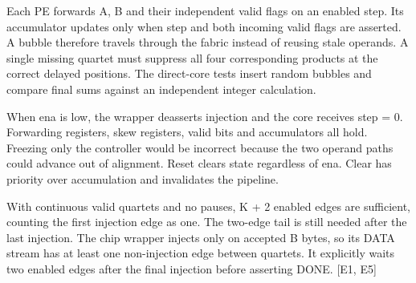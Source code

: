 \documentclass[10pt,letterpaper]{article}
\begin{document}
Each PE forwards A, B and their independent valid flags on an enabled step. Its accumulator updates only when step and both incoming valid flags are asserted. A bubble therefore travels through the fabric instead of reusing stale operands. A single missing quartet must suppress all four corresponding products at the correct delayed positions. The direct-core tests insert random bubbles and compare final sums against an independent integer calculation.

When ena is low, the wrapper deasserts injection and the core receives step = 0. Forwarding registers, skew registers, valid bits and accumulators all hold. Freezing only the controller would be incorrect because the two operand paths could advance out of alignment. Reset clears state regardless of ena. Clear has priority over accumulation and invalidates the pipeline.

With continuous valid quartets and no pauses, K + 2 enabled edges are sufficient, counting the first injection edge as one. The two-edge tail is still needed after the last injection. The chip wrapper injects only on accepted B bytes, so its DATA stream has at least one non-injection edge between quartets. It explicitly waits two enabled edges after the final injection before asserting DONE. [E1, E5]

\clearpage
\end{document}
